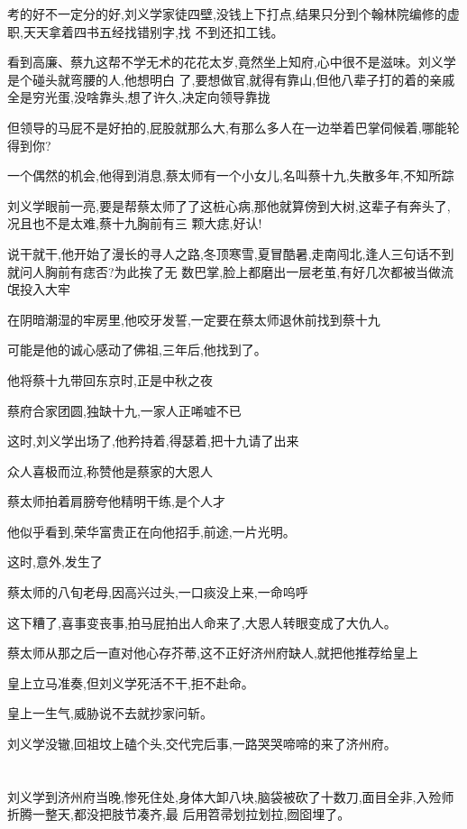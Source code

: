 ﻿\documentclass[12pt]{article}
\begin{document}
考的好不一定分的好,刘义学家徒四壁,没钱上下打点,结果只分到个翰林院编修的虚职,天天拿着四书五经找错别字,找
不到还扣工钱。

看到高廉、蔡九这帮不学无术的花花太岁,竟然坐上知府,心中很不是滋味。刘义学是个碰头就弯腰的人,他想明白
了,要想做官,就得有靠山,但他八辈子打的着的亲戚全是穷光蛋,没啥靠头,想了许久,决定向领导靠拢

但领导的马屁不是好拍的,屁股就那么大,有那么多人在一边举着巴掌伺候着,哪能轮得到你?

一个偶然的机会,他得到消息,蔡太师有一个小女儿,名叫蔡十九,失散多年,不知所踪

刘义学眼前一亮,要是帮蔡太师了了这桩心病,那他就算傍到大树,这辈子有奔头了,况且也不是太难,蔡十九胸前有三
颗大痣,好认!

说干就干,他开始了漫长的寻人之路,冬顶寒雪,夏冒酷暑,走南闯北,逢人三句话不到就问人胸前有痣否?为此挨了无
数巴掌,脸上都磨出一层老茧,有好几次都被当做流氓投入大牢

在阴暗潮湿的牢房里,他咬牙发誓,一定要在蔡太师退休前找到蔡十九

可能是他的诚心感动了佛祖,三年后,他找到了。

他将蔡十九带回东京时,正是中秋之夜

蔡府合家团圆,独缺十九,一家人正唏嘘不已

这时,刘义学出场了,他矜持着,得瑟着,把十九请了出来

众人喜极而泣,称赞他是蔡家的大恩人

蔡太师拍着肩膀夸他精明干练,是个人才

他似乎看到,荣华富贵正在向他招手,前途,一片光明。

这时,意外,发生了

蔡太师的八旬老母,因高兴过头,一口痰没上来,一命呜呼

这下糟了,喜事变丧事,拍马屁拍出人命来了,大恩人转眼变成了大仇人。

蔡太师从那之后一直对他心存芥蒂,这不正好济州府缺人,就把他推荐给皇上

皇上立马准奏,但刘义学死活不干,拒不赴命。

皇上一生气,威胁说不去就抄家问斩。

刘义学没辙,回祖坟上磕个头,交代完后事,一路哭哭啼啼的来了济州府。

\section{}

刘义学到济州府当晚,惨死住处,身体大卸八块,脑袋被砍了十数刀,面目全非,入殓师折腾一整天,都没把肢节凑齐,最
后用笤帚划拉划拉,囫囵埋了。
\end{document}
